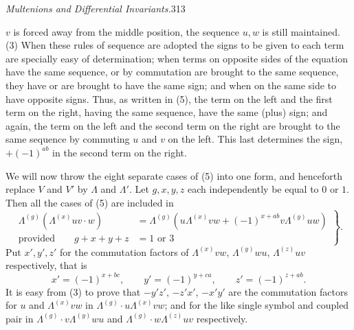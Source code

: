 \documentclass[11pt]{article}
\begin{document}
\newpage\thispagestyle{empty}\begin{center}\textit{Multenions and Differential Invariants.}\hfill 313\end{center}
$v$ is forced away from the middle position, the sequence $u,w$ is still maintained. (3) When these rules of sequence are adopted the signs to be given to each term are specially easy of determination; when terms on opposite sides of the equation have the same sequence, or by commutation are brought to the same sequence, they have or are brought to have the same sign; and when on the same side to have opposite signs. Thus, as written in (5), the term on the left and the first term on the right, having the same sequence, have the same (plus) sign; and again, the term on the left and the second term on the right are brought to the same sequence by commuting $u$ and $v$ on the left. This last determines the sign, $+(-1)^{ab}$ in the second term on the right.

\indent We will now throw the eight separate cases of (5) into one form, and henceforth replace $V$ and $V'$ by $\Lambda$ and $\Lambda'$. Let $g,x,y,z$ each independently be equal to $0$ or $1$. Then all the cases of (5) are included in
\begin{equation}\left.\begin{aligned}
\Lambda^{(g)}(\Lambda^{(x)}uv\cdot w)&=\Lambda^{(g)}(u\Lambda^{(x)}vw+(-1)^{x+ab}v\Lambda^{(y)}uw)\\
\text{provided}\qquad g+x+y+z&=1\text{ or }3
\end{aligned}\right\}.\tag{6}\end{equation}
Put $x',y',z'$ for the commutation factors of $\Lambda^{(x)}vw$, $\Lambda^{(y)}wu$, $\Lambda^{(z)}uv$ respectively, that is
\begin{equation}x'=(-1)^{x+bc},\qquad y'=(-1)^{y+ca},\qquad z'=(-1)^{z+ab}.\tag{7}\end{equation}
It is easy from (3) to prove that $-y'z'$, $-z'x'$, $-x'y'$ are the commutation factors for $u$ and $\Lambda^{(x)}vw$ in $\Lambda^{(g)}\cdot u\Lambda^{(x)}vw$; and for the like single symbol and coupled pair in $\Lambda^{(g)}\cdot v\Lambda^{(y)}wu$ and $\Lambda^{(g)}\cdot w\Lambda^{(z)}uv$ respectively.
\end{document}
